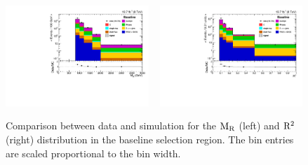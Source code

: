 \begin{figure}[htbp]
 \centering
 \includegraphics[width=0.48\textwidth]{figures/razor_selection/plots/DataMC_MR_HLT_width}
 ~
 \includegraphics[width=0.48\textwidth]{figures/razor_selection/plots/DataMC_R2_HLT_width}
 \caption{Comparison between data and simulation for the $\mathrm{M_R}$ (left) and $\mathrm{R^2}$ (right)
distribution in the baseline selection region. The bin entries are scaled proportional to the bin
width.
 \label{fig:boost_baseline_dataMC}}
\end{figure}
